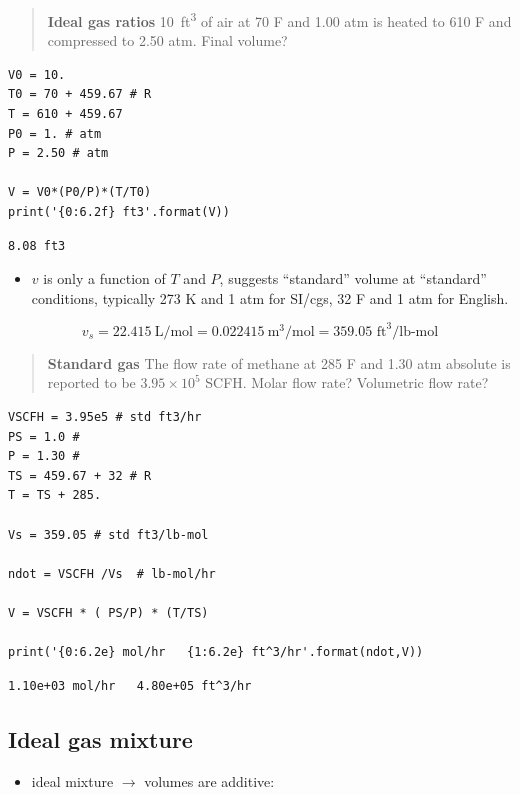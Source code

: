 \documentclass[11pt]{article}
\begin{document}
\begin{quote}
\hline
\textbf{Ideal gas ratios} \SI{10}{ft\cubed} of air at 70 F and 1.00 atm is heated to 610 F and compressed to 2.50 atm.  Final volume?
\hline
\end{quote}
\begin{verbatim}
V0 = 10.
T0 = 70 + 459.67 # R
T = 610 + 459.67
P0 = 1. # atm
P = 2.50 # atm

V = V0*(P0/P)*(T/T0)
print('{0:6.2f} ft3'.format(V))
\end{verbatim}

\begin{verbatim}
8.08 ft3
\end{verbatim}

\begin{itemize}
\item \(v\) is only a function of $T$ and $P$, suggests ``standard'' volume at ``standard'' conditions, typically 273 K and 1 atm for SI/cgs, 32 F and 1 atm for English.
\end{itemize}

\[ v_{s} = 22.415~\text{L/mol} = 0.022415~\text{m}^{3}\text{/mol} = 359.05 \text{ ft}^{3}\text{/lb-mol}\]

\begin{quote}
\hline
\textbf{Standard gas} The flow rate of methane at 285 F and 1.30 atm absolute is reported to be \(3.95\times 10^5\) SCFH.  Molar flow rate?  Volumetric flow rate?
\hline
\end{quote}
\begin{verbatim}
VSCFH = 3.95e5 # std ft3/hr
PS = 1.0 #
P = 1.30 #
TS = 459.67 + 32 # R
T = TS + 285.

Vs = 359.05 # std ft3/lb-mol

ndot = VSCFH /Vs  # lb-mol/hr

V = VSCFH * ( PS/P) * (T/TS)

print('{0:6.2e} mol/hr   {1:6.2e} ft^3/hr'.format(ndot,V))
\end{verbatim}

\begin{verbatim}
1.10e+03 mol/hr   4.80e+05 ft^3/hr
\end{verbatim}

\subsection{Ideal gas mixture}
\label{sec-7-3}
\begin{itemize}
\item ideal mixture $\to$ volumes are additive:
\end{itemize}
\end{document}
